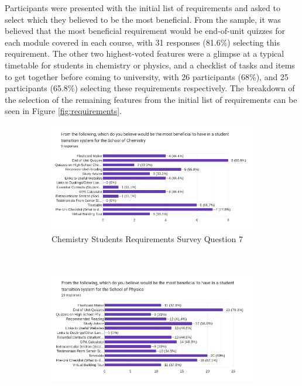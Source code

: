 \documentclass{l4proj}
\begin{document}
Participants were presented with the initial list of requirements and asked to select which they believed to be the most beneficial. From the sample,  it was believed that the most beneficial requirement would be end-of-unit quizzes for each module covered in each course,  with 31 responses (81.6\%) selecting this requirement. The other two highest-voted features were a glimpse at a typical timetable for students in chemistry or physics,  and a checklist of tasks and items to get together before coming to university,  with 26 participants (68\%),  and 25 participants (65.8\%) selecting these requirements respectively. The breakdown of the selection of the remaining features from the initial list of requirements can be seen in Figure \ref{fig:requirements}.

\begin{figure}[ht]
    \centering
    \begin{subfigure}[b]{0.7\textwidth}
        \includegraphics[width=\textwidth]{images/chemistry_requirements_results.pdf}
        \caption{Chemistry Students Requirements Survey Question 7}
        \label{fig:req1}
    \end{subfigure}
    ~ %
    \begin{subfigure}[b]{0.7\textwidth}
        \includegraphics[width=\textwidth]{images/physics_requirements_results.pdf}

\end{subfigure}
\end{figure}
\end{document}
